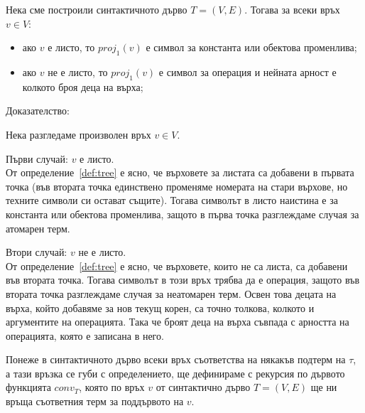 \documentclass[12pt,twoside,a4paper]{article}
\begin{document}
	\begin{statement}\label{stmnt:tree-vertices} Нека сме построили синтактичното дърво $T=(V,E)$. Тогава за всеки връх $v \in V$:
		\begin{itemize}
			\item ако $v$ е листо, то $proj_1(v)$ е символ за константа или обектова променлива;
			\item ако $v$ не е листо, то $proj_1(v)$ е символ за операция и нейната арност е колкото броя деца на върха;
		\end{itemize}
		
		\noindent Доказателство:
		
		Нека разгледаме произволен връх $v \in V$. 
		
		Първи случай: $v$ е листо.\\
		От определение~\ref{def:tree} е ясно, че върховете за листата са добавени в първата точка (във втората точка единствено променяме номерата на стари върхове, но техните символи си остават същите). Тогава символът в листо наистина е за константа или обектова променлива, защото в първа точка разглеждаме случая за атомарен терм.
		
		Втори случай: $v$ не е листо.\\
		От определение~\ref{def:tree} е ясно, че върховете, които не са листа, са добавени във втората точка. Тогава символът в този връх трябва да е операция, защото във втората точка разглеждаме случая за неатомарен терм. Освен това децата на върха, който добавяме за нов текущ корен, са точно толкова, колкото и аргументите на операцията. Така че броят деца на върха съвпада с арността на операцията, която е записана в него.
	\end{statement}
	
	Понеже в синтактичното дърво всеки връх съответства на някакъв подтерм на $\tau$, а тази връзка се губи с определението, ще дефинираме с рекурсия по дървото функцията $conv_T$, която по връх $v$ от синтактично дърво $T=(V,E)$ ще ни връща съответния терм за поддървото на $v$.
	
\end{document}
